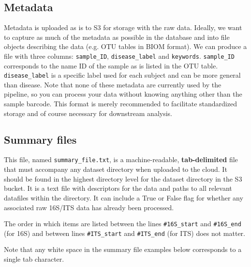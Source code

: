 \documentclass[11pt, oneside]{article}   	%
\begin{document}
\subsection{Metadata}
Metadata is uploaded as is to S3 for storage with the raw data.  Ideally, we want to capture as much of the metadata as possible in the database and into file objects describing the data (e.g. OTU tables in BIOM format).  We can produce a file with three columns: {\tt sample\_ID}, {\tt disease\_label} and {\tt keywords}.  {\tt sample\_ID} corresponds to the name ID of the sample as is listed in the OTU table.  {\tt disease\_label} is a specific label used for each subject and can be more general than disease.  Note that none of these metadata are currently used by the pipeline, so you can process your data without knowing anything other than the sample barcode.  This format is merely recommended to facilitate standardized storage and of course necessary for downstream analysis.

\subsection{Summary files}
This file, named {\tt summary\_file.txt}, is a machine-readable, \textbf{tab-delimited} file that must accompany any dataset directory when uploaded to the cloud.  It should be found in the highest directory level for the dataset directory in the S3 bucket.  It is a text file with descriptors for the data and paths to all relevant datafiles within the directory.  It can include a True or False flag for whether any associated raw 16S/ITS data has already been processed.  

The order in which items are listed between the lines {\tt \#16S\_start} and {\tt \#16S\_end} (for 16S) and between lines {\tt \#ITS\_start} and {\tt \#ITS\_end} (for ITS) does not matter.  

Note that any white space in the summary file examples below corresponds to a single tab character.
\end{document}
